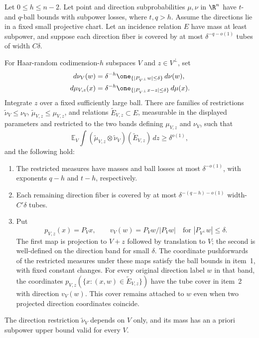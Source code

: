 \documentclass[11pt,reqno]{amsart}
\begin{document}
\begin{lemma}\label{ang:slice-selection}
Let $0\le h\le n-2$. Let point and direction subprobabilities $\mu,\nu$ in $\R^n$ have
$t$- and $q$-ball bounds with subpower losses, where $t,q>h$.
Assume the directions lie in a fixed small projective chart. Let an
incidence relation $E$ have mass at least subpower, and suppose each
direction fiber is covered by at most $\delta^{-q-o(1)}$ tubes of
width $C\delta$.

For Haar-random codimension-$h$ subspaces $V$ and
$z\in V^\perp$, set
\begin{align*}
 d\nu_V(w)&=\delta^{-h}\one_{\{|P_{V^\perp}w|\le\delta\}}\,d\nu(w),\\
 d\mu_{V,z}(x)&=\delta^{-h}
       \one_{\{|P_{V^\perp}x-z|\le\delta\}}\,d\mu(x).
\end{align*}
Integrate $z$ over a fixed sufficiently large ball. There are families of restrictions
$\widetilde\nu_V\le\nu_V$, $\widetilde\mu_{V,z}\le\mu_{V,z}$,
and relations $\widetilde E_{V,z}\subset E$, measurable in the displayed
parameters and restricted to the two bands defining $\mu_{V,z}$ and
$\nu_V$, such that
\[
 \mathbb E_V\int
 (\widetilde\mu_{V,z}\otimes\widetilde\nu_V)(\widetilde E_{V,z})\,dz
 \ge\delta^{o(1)},
\]
and the following hold:
\begin{enumerate}
\item The restricted measures have masses and ball losses at most
$\delta^{-o(1)}$, with exponents $q-h$ and $t-h$, respectively.
\item Each remaining direction fiber is covered by at most
$\delta^{-(q-h)-o(1)}$ width-$C'\delta$ tubes.
\item Put
\[
 p_{V,z}(x)=P_Vx,\qquad v_V(w)=P_Vw/|P_Vw|
 \quad\text{for }|P_{V^\perp}w|\le\delta.
\]
The first map is projection to $V+z$ followed by translation to $V$;
the second is well-defined on the direction band for small $\delta$.
The coordinate pushforwards of the restricted measures under these maps
satisfy the ball bounds in item~1, with fixed constant changes. For every
original direction label $w$ in that band, the coordinates
$p_{V,z}(\{x:(x,w)\in\widetilde E_{V,z}\})$ have the tube cover in
item~2 with direction $v_V(w)$. This cover remains attached to $w$ even
when two projected direction coordinates coincide.
\end{enumerate}
The direction restriction $\widetilde\nu_V$ depends on $V$ only, and its
mass has an a priori subpower upper bound valid for every $V$.
\end{lemma}
\end{document}
